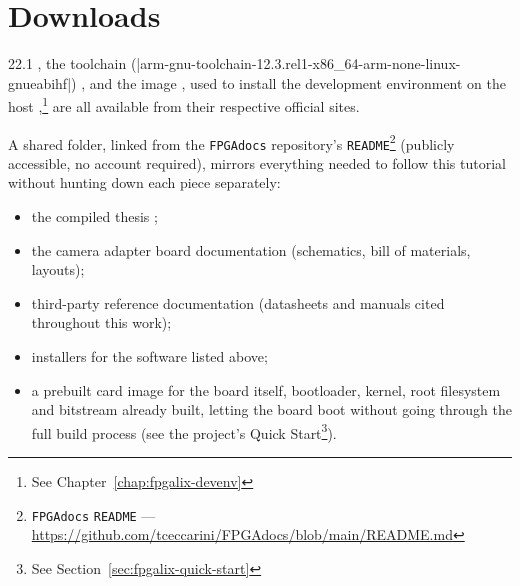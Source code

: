 \chapter{Downloads}
\label{chap:fpgalix-downloads}

 22.1 \cite{ALTERA-QUARTUS}, the  toolchain (|arm-gnu-toolchain-12.3.rel1-x86_64-arm-none-linux-gnueabihf|) \cite{ARM-GNU-TOOLCHAIN}, and the  image \cite{UBUNTU-2204}, used to install the development environment on the host ,\footnote{See Chapter~\ref{chap:fpgalix-devenv}} are all available from their respective official sites.

A shared folder, linked from the \texttt{FPGAdocs} repository's \texttt{README}\footnote{\texttt{FPGAdocs} \texttt{README} --- \url{https://github.com/tceccarini/FPGAdocs/blob/main/README.md}} (publicly accessible, no account required), mirrors everything needed to follow this tutorial without hunting down each piece separately:

\begin{itemize}
    \item the compiled thesis ;
    \item the camera adapter board documentation (schematics, bill of materials,  layouts);
    \item third-party reference documentation (datasheets and manuals cited throughout this work);
    \item installers for the software listed above;
    \item a prebuilt  card image for the  board itself, bootloader, kernel, root filesystem and  bitstream already built, letting the board boot without going through the full build process (see the project's Quick Start\footnote{See Section~\ref{sec:fpgalix-quick-start}}).
\end{itemize}
